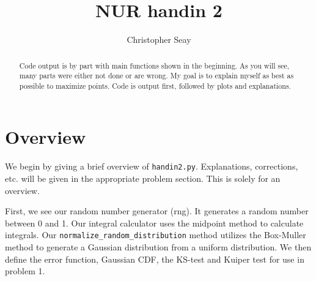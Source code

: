 \documentclass[a4paper,10pt]{article}
\title{NUR handin 2}
\author{Christopher Seay}
\begin{document}
\maketitle

\begin{abstract}
 Code output is by part with main functions shown in the beginning.
 As you will see, many parts were either not done or are wrong. 
 My goal is to explain myself as best as possible to maximize points.
 Code is output first, followed by plots and explanations.
\end{abstract}

\section*{Overview}
 We begin by giving a brief overview of \texttt{handin2.py}. Explanations,
 corrections, etc. will be given in the appropriate problem section. This is
 solely for an overview.
 
First, we see our random number generator (rng). It generates a random number
between 0 and 1. Our integral calculator uses the midpoint method to calculate 
integrals. Our \texttt{normalize\_random\_distribution} method utilizes the
Box-Muller method to generate a Gaussian distribution from a uniform 
distribution. We then define the error function, Gaussian CDF, the 
KS-test and Kuiper test for use in problem 1.



















% 

% 



% 

% 

% 

% 

% 

% 





% 
\end{document}

